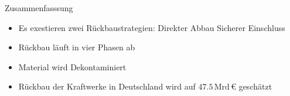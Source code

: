 \begin{frame}{Zusammenfasssung}
  \begin{itemize}
    \setlength\itemsep{1.2em}
    \item { Es exestieren zwei Rückbaustrategien:  Direkter Abbau  Sicherer Einschluss}
    \item { Rückbau läuft in vier Phasen ab }
    \item { Material wird Dekontaminiert}
    \item { Rückbau der Kraftwerke in Deutschland wird auf  $\num{47.5} \, \mathrm{Mrd} \,\euro$ geschätzt}
  \end{itemize}
\end{frame}

\begin{frame}[allowframebreaks]
  \nocite{*}
  \printbibliography
\end{frame}

